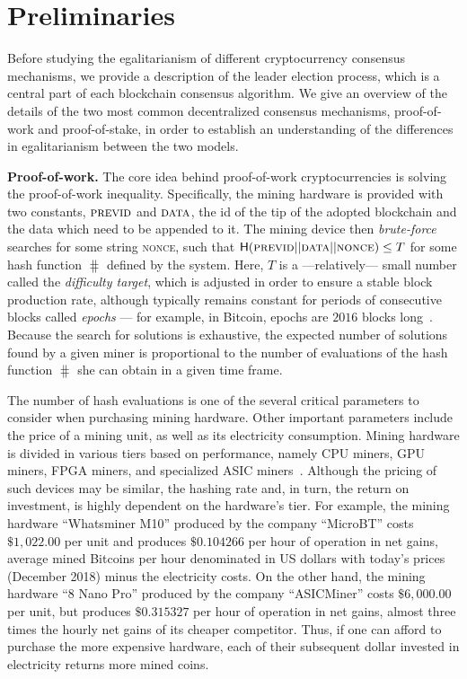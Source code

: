 \section{Preliminaries}\label{sec:preliminaries}

Before studying the egalitarianism of different cryptocurrency consensus mechanisms, we
provide a description of the leader election process, which is a central part
of each blockchain consensus algorithm. We give an
overview of the details of the two most common decentralized consensus mechanisms,
proof-of-work and proof-of-stake, in order to establish an understanding of the
differences in egalitarianism between the two models.

\noindent\textbf{Proof-of-work.}
The core idea behind proof-of-work cryptocurrencies is solving the
proof-of-work inequality.  Specifically, the mining hardware is provided with
two constants, $\textsc{previd}$ and $\textsc{data}$, \ie the id of the
tip of the adopted blockchain and the data which need to be appended to it.  The mining
device then \emph{brute-force} searches for some string \textsc{nonce}, such
that $\mathsf{H}(\textsc{previd} || \textsc{data} || \textsc{nonce}) \leq T$ for
some hash function $\hash$ defined by the system. Here, $T$ is a
---relatively--- small number called the \emph{difficulty target}, which is
adjusted in order to ensure a stable block production rate, although typically
remains constant for periods of consecutive blocks called \emph{epochs} --- for
example, in Bitcoin, epochs are $2016$ blocks long~\cite{SP:BMCNKF15}. Because the search for
solutions is exhaustive, the expected number of solutions found by a given
miner is proportional to the number of evaluations of the
hash function $\hash$ she can obtain in a given time frame.

The number of hash evaluations is one of the several critical parameters to
consider when purchasing mining hardware. Other important parameters include
the price of a mining unit, as well as its electricity consumption.  Mining
hardware is divided in various tiers based on performance, namely CPU miners,
GPU miners, FPGA miners, and specialized ASIC miners~\cite{taylor2013bitcoin}.  Although the pricing of
such devices may be similar, the hashing rate and, in turn, the return on
investment, is highly dependent on the hardware's tier.  For example,
the mining hardware ``Whatsminer M10'' produced by the company ``MicroBT''
costs $\$1{,}022.00$ per unit and produces $\$0.104266$ per hour of operation in
net gains, \ie average mined Bitcoins per hour denominated in US dollars with today's
prices (December 2018) minus the electricity costs. On the other hand, the
mining hardware ``8 Nano Pro'' produced by the company ``ASICMiner'' costs
$\$6{,}000.00$ per unit, but produces $\$0.315327$ per hour of operation in net
gains, \ie almost three times the hourly net gains of its cheaper competitor.
Thus, if one can afford to purchase the more expensive hardware, each of their
subsequent dollar invested in electricity returns more mined coins.

